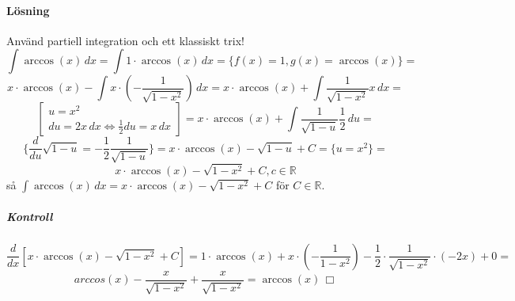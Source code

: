 \paragraph{Lösning}
Använd partiell integration och ett klassiskt trix!
\begin{equation*}
    \int \arccos(x)\, dx=
    \int 1\cdot \arccos(x)\, dx=
    \{f(x)=1, g(x)=\arccos(x)\}=
\end{equation*}
\begin{equation*}
    x\cdot \arccos(x)-\int x\cdot (-\frac{1}{\sqrt{1-x^2}})\, dx=
    x\cdot \arccos(x)+\int \frac{1}{\sqrt{1-x^2}}x\, dx=
\end{equation*}
\begin{equation*}
    \begin{bmatrix}
        u=x^2 \\
        du=2x\, dx\Leftrightarrow \frac{1}{2}du=x\, dx
    \end{bmatrix}=
    x\cdot\arccos(x)+\int\frac{1}{\sqrt{1-u}}\frac{1}{2}\, du=
\end{equation*}
\begin{equation*}
    \{\frac{d}{du}\sqrt{1-u}=-\frac{1}{2}\frac{1}{\sqrt{1-u}}\}=
    x\cdot\arccos(x)-\sqrt{1-u}+C=
    \{u=x^2\}=
\end{equation*}
\begin{equation*}
    x\cdot\arccos(x)-\sqrt{1-x^2}+C,c\in\mathbb{R}
\end{equation*}
så $\int\arccos(x)\, dx=x\cdot\arccos(x)-\sqrt{1-x^2}+C$ för $C\in\mathbb{R}$.
\subparagraph{Kontroll}
\begin{equation*}
    \frac{d}{dx}[x\cdot\arccos(x)-\sqrt{1-x^2}+C]=
    1\cdot\arccos(x)+x\cdot(-\frac{1}{1-x^2})-\frac{1}{2}\cdot\frac{1}{\sqrt{1-x^2}}\cdot(-2x)+0=
\end{equation*}
\begin{equation*}
    arccos(x)-\frac{x}{\sqrt{1-x^2}}+\frac{x}{\sqrt{1-x^2}}
    =\arccos(x)\, \Box
\end{equation*}

